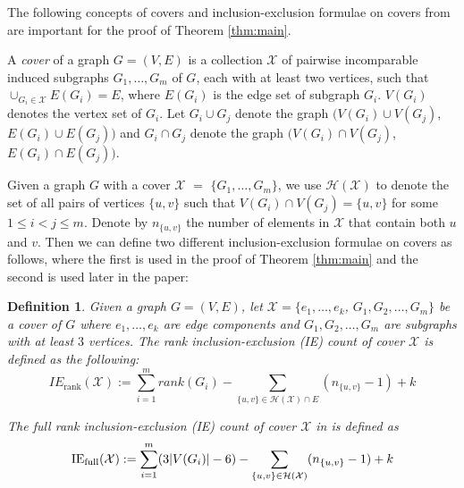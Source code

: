 \documentclass[10pt]{article}
\def\H{\mathcal {H}}
\def\X{\mathcal {X}}
\newtheorem{dfn}{Definition}
\begin{document}
\medskip\noindent
The following concepts of covers and inclusion-exclusion formulae on covers from  \cite{crapo:structuralRigidity:1979, sitharam:zhou:tractableADG:2004, andrewThesis, bib:survey, lovasz:yemini, JacksonJordansparse:2005, JacksonJordanrank:2006} are important for the proof of Theorem \ref{thm:main}.


A \emph{cover} of a graph $G=(V, E)$ is a collection $\X$
of pairwise incomparable induced subgraphs $G_1, \ldots, G_m$ of $G$, each with at least two vertices, such that $\cup_{G_i\in \X} E(G_i) = E$, where $E(G_i)$ is the edge set of subgraph $G_i$. $V(G_i)$ denotes the vertex set of $G_i$. Let $G_i\cup G_j$ denote the graph $(V(G_i)\cup V(G_j)$, $E(G_i)\cup E(G_j))$ and $G_i\cap G_j$ denote the graph $(V(G_i)\cap V(G_j)$, $E(G_i)\cap E(G_j))$. 


Given a graph $G$ with a cover $\X$ $=$  $\{G_1, \ldots, G_m\}$, we use $\H(\mathcal{X})$ to denote the set of all pairs of vertices $\{u, v\}$ such that $V(G_i) \cap V(G_j) = \{u,
v\}$ for some $1 \leq i < j \leq m$. Denote by $n_{\{u, v\}}$ the number of elements in $\mathcal{X}$ that contain both $u$ and $v$. Then we can define two different inclusion-exclusion formulae on covers as follows, where the first is used in the proof of Theorem \ref{thm:main} and the second is used later in the paper:



\begin{dfn}\label{dfn:IE}
Given a graph $G=(V, E)$, let $\X =\{e_1, \ldots, e_k$, $G_1, G_2, \ldots, G_m\}$ be a cover of $G$ where $e_1, \ldots, e_k$ are edge components and $G_1, G_2, \ldots, G_m$ are subgraphs with at least $3$ vertices.
The \emph{rank inclusion-exclusion (IE) count} of cover $\mathcal{X}$ is defined as the following:
\begin{equation*}
IE_{\text{rank}}(\X):=\sum\limits_{i=1}^m{rank(G_i)}  -  \sum\limits_{\{u, v\} \in \H(\X)\cap E}(n_{\{u, v\}}
-1)+k
\end{equation*}

The \emph{full rank inclusion-exclusion (IE) count} of cover $\X$ in is defined as
\begin{equation*}
\hbox{IE}_{\text{full}}(\X) :=
\sum\limits_{i=1}^m(3|V(G_i)|-6)  -  \sum\limits_{\{u, v\} \in \H(\X)}(n_{\{u, v\}}
-1)+k
\end{equation*}
\end{dfn}

\begin{comment}
The {\em Dress rank inclusion-exclusion (IE) count} of cover $\mathcal{X}$ is defined as the following:
\begin{equation*}
IE_{\text{Dress}}(\X):=\sum\limits_{i=1}^m{rank(G^\star_{i})}  -  \sum\limits_{\{u, v\} \in \H(\X)}(n_{\{u, v\}}-1) +k
\end{equation*}
The \emph{strong rank inclusion-exclusion (IE) count} of cover $\mathcal{X}$ is defined as the following:
\begin{equation*}
IE_{\text{strong}}(\X):=\sum\limits_{i=1}^m{rank(G_i)}  -  \sum\limits_{\{u, v\} \in \H(\X)}(n_{\{u, v\}}-1) +k
\end{equation*}
\end{comment}
\end{document}

